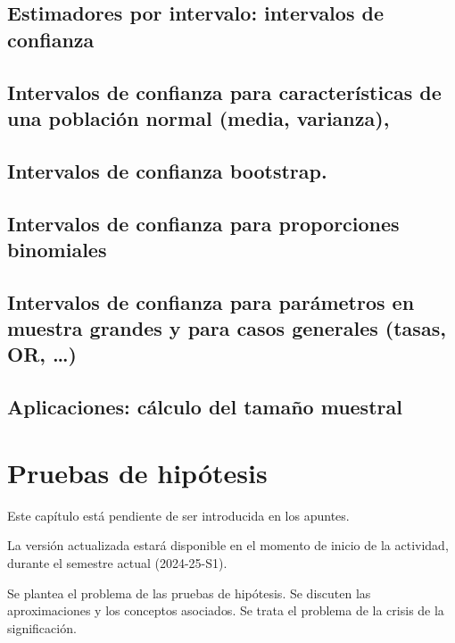\documentclass[
]{article}
\begin{document}
\subsection{Estimadores por intervalo: intervalos de confianza}\label{estimadores-por-intervalo-intervalos-de-confianza}

\subsection{Intervalos de confianza para características de una población normal (media, varianza),}\label{intervalos-de-confianza-para-caracteruxedsticas-de-una-poblaciuxf3n-normal-media-varianza}

\subsection{Intervalos de confianza bootstrap.}\label{intervalos-de-confianza-bootstrap.}

\subsection{Intervalos de confianza para proporciones binomiales}\label{intervalos-de-confianza-para-proporciones-binomiales}

\subsection{Intervalos de confianza para parámetros en muestra grandes y para casos generales (tasas, OR, \ldots)}\label{intervalos-de-confianza-para-paruxe1metros-en-muestra-grandes-y-para-casos-generales-tasas-or}

\subsection{Aplicaciones: cálculo del tamaño muestral}\label{aplicaciones-cuxe1lculo-del-tamauxf1o-muestral}

\section{Pruebas de hipótesis}\label{pruebas-de-hipuxf3tesis}

Este capítulo está pendiente de ser introducida en los apuntes.

La versión actualizada estará disponible en el momento de inicio de la actividad, durante el semestre actual (2024-25-S1).

Se plantea el problema de las pruebas de hipótesis. Se discuten las aproximaciones y los conceptos asociados. Se trata el problema de la crisis de la significación.
\end{document}

